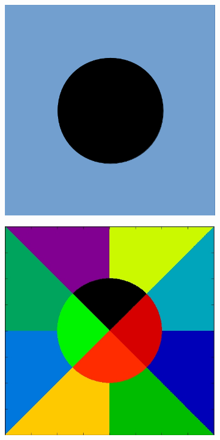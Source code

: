 \begin{figure}[h!]
	\centering
	\begin{subfigure}{0.3\textwidth}
		\centering
		\includegraphics[width=\linewidth]{figures/simp_fuel_pin.png}
		\caption{}
		\label{fig:rings-sectors-a}
	\end{subfigure}
	\begin{subfigure}{0.3\textwidth}
		\centering
		\includegraphics[width=\linewidth]{figures/sector_discr.jpg}

\end{subfigure}
\end{figure}
